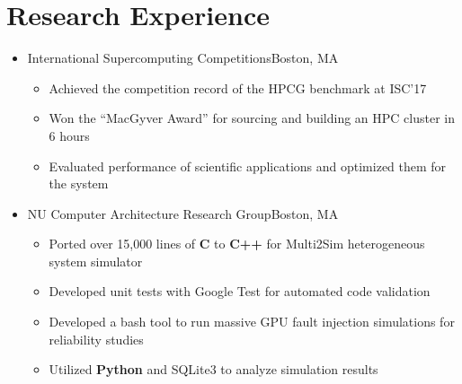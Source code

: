 \documentclass[11pt,letterpaper,sans]{moderncv}
\begin{document}
\vspace{-3pt}



\section{Research Experience}

\vspace{2pt}

\begin{itemize}

\item[] {
{International Supercomputing Competitions}{Boston, MA}{}{\vspace{1pt}}
\vspace{-8pt}	\begin{itemize}
	
		\item Achieved the competition record of the HPCG benchmark at ISC'17
		\item Won the ``MacGyver Award'' for sourcing and building an HPC cluster in 6 hours
		\item Evaluated performance of scientific applications and optimized them for the system
		\end{itemize}
}
\vspace{6pt}


\item[] {
{NU Computer Architecture Research Group}{Boston, MA}{}{\vspace{1pt}}
\vspace{-8pt}	\begin{itemize}
		\item Ported over 15,000 lines of \textbf{C} to \textbf{C++} for Multi2Sim heterogeneous system simulator
		\item Developed unit tests with Google Test for automated code validation
		\item Developed a bash tool to run massive GPU fault injection simulations for reliability studies
		\item Utilized \textbf{Python} and SQLite3 to analyze simulation results
		\end{itemize}
		
}

\end{itemize}
\vspace{-3pt}
\end{document}
